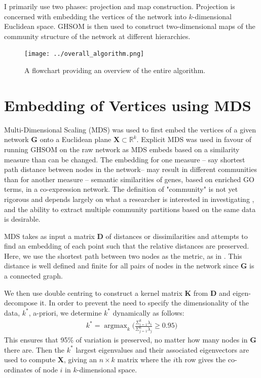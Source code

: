 \documentclass{report}
\DeclareMathOperator*{\argmax}{argmax}
\begin{document}
	I primarily use two phases: projection and map construction. Projection is concerned with embedding the vertices of the network into $k$-dimensional Euclidean space. GHSOM is then used to construct two-dimensional maps of the community structure of the network at different hierarchies.
	
	\begin{figure}
	\centering
	\texttt{[image: ../overall\_algorithm.png]}
	\caption{A flowchart providing an overview of the entire algorithm.}
	\label{overall_algorithm}
	\end{figure}
	
	\section{Embedding of Vertices using MDS} 
	Multi-Dimensional Scaling (MDS) was used to first embed the vertices of a given network $\textbf{G}$ onto a Euclidean plane $\textbf{X}\subset\mathbb{R}^k$.
	Explicit MDS was used in favour of running GHSOM on the raw network as MDS embeds based on a similarity  measure than can be changed. The embedding for one measure -- say shortest path distance between nodes in the network-- may result in different communities than for another measure -- semantic similarities of genes, based on enriched GO terms, in a co-expression network. The definition of "community" is not yet rigorous and depends largely on what a researcher is interested in investigating \cite{schaub2016many}, and the ability to extract multiple community partitions based on the same data is desirable.
	
	MDS takes as input a matrix $\textbf{D}$ of distances or dissimilarities and attempts to find an embedding of each point such that the relative distances are preserved. 
	Here, we use the shortest path between two nodes as the metric, as in \cite{yamakawa2006self}. 
	This distance is well defined and finite for all pairs of nodes in the network since $\textbf{G}$ is a connected graph. 
	
	We then use double centring to construct a kernel matrix $\textbf{K}$ from $\textbf{D}$ and eigen-decompose it. 
	In order to prevent the need to specify the dimensionality of the data, $k^*$, a-priori, we determine $k^*$ dynamically as follows:
	\begin{align}
	k^* = \argmax_k \Bigg(\frac{\Sigma_{i=1}^k \lambda_i}{\Sigma_{j=1}^n \lambda_j} \geq 0.95 \Bigg)
	\end{align}
	This ensures that 95\% of variation is preserved, no matter how many nodes in $\textbf{G}$ there are. 
	Then the $k^*$ largest eigenvalues and their associated eigenvectors are used to compute $\textbf{X}$, giving an $n\times k$ matrix where the $i$th row gives the co-ordinates of node $i$ in $k$-dimensional space.
	
\end{document}
